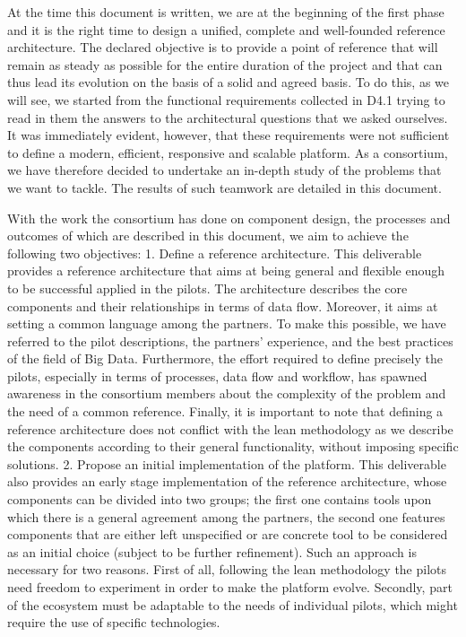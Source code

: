 At the time this document is written, we are at the beginning of the first phase and it is the right time to design a unified, complete and well-founded reference architecture. The declared objective is to provide a point of reference that will remain as steady as possible for the entire duration of the project and that can thus lead its evolution on the basis of a solid and agreed basis. To do this, as we will see, we started from the functional requirements collected in D4.1 trying to read in them the answers to the architectural questions that we asked ourselves.  It was immediately evident, however, that these requirements were not sufficient to define a modern, efficient, responsive and scalable platform. As a consortium, we have therefore decided to undertake an in-depth study of the problems that we want to tackle. The results of such teamwork are detailed in this document.  

With the work the consortium has done on component design, the processes and outcomes of which are described in this document, we aim to achieve the following two objectives:
1.	Define a reference architecture. This deliverable provides a reference architecture that aims at being general and flexible enough to be successful applied in the pilots. The architecture describes the core components and their relationships in terms of data flow. Moreover, it aims at setting a common language among the partners. To make this possible, we have referred to the pilot descriptions, the partners’ experience, and the best practices of the field of Big Data. Furthermore, the effort required to define precisely the pilots, especially in terms of processes, data flow and workflow, has spawned awareness in the consortium members about the complexity of the problem and the need of a common reference. Finally, it is important to note that defining a reference architecture does not conflict with the lean methodology as we describe the components according to their general functionality, without imposing specific solutions.
2.	Propose an initial implementation of the platform. This deliverable also provides an early stage implementation of the reference architecture, whose components can be divided into two groups; the first one contains tools upon which there is a general agreement among the partners, the second one features components that are either left unspecified or are concrete tool to be considered as an initial choice (subject to be further refinement). Such an approach is necessary for two reasons. First of all, following the lean methodology the pilots need freedom to experiment in order to make the platform evolve. Secondly, part of the ecosystem must be adaptable to the needs of individual pilots, which might require the use of specific technologies.  


